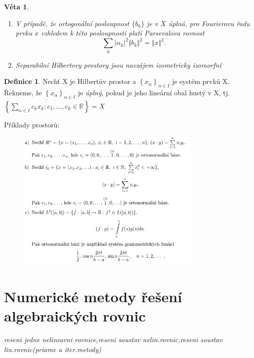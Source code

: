 \documentclass[a4]{report}
\newtheorem{theorem}{Věta}
\theoremstyle{definition}
\newtheorem{definition}{Definice}[section]
\begin{document}
{\begin{theorem}
\begin{enumerate}
		\item V případě, že ortogonální posloupnost $\{b_k\}$ je v $X$ úplná, pro Fourierovu řadu prvku $x$ vzhledem k této  posloupnosti platí \textit{Parsevalova rovnost} \begin{equation*}
			\sum_k|\alpha_k|^2\Vert b_k\Vert^2 = \Vert x \Vert ^2.
		\end{equation*}
		\item Separabilní Hilbertovy prostory jsou navzájem izometricky izomorfní
	\end{enumerate}
\end{theorem}

\begin{definition}
Nechť X je Hilbertův prostor a $ \left\lbrace x_{\alpha} \right\rbrace_{\alpha \in I} $ je systém prvků X. Řekneme, že $ \left\lbrace x_{\alpha} \right\rbrace_{\alpha \in I} $ je \textit{úplný}, pokud je jeho lineární obal hustý v X, tj. $ \overline{\left\lbrace \sum_{\alpha \in I} c_k x_k: c_1,\ldots,c_k \in \mathbb{R} \right\rbrace} =X $
\end{definition}






Příklady prostorů:
\begin{figure}[h!]
\includegraphics[width=0.8\textwidth]{priklady_prostoru}
\end{figure}


\section{Numerické metody řešení algebraických rovnic}  
\textit{reseni jedne nelinearni rovnice,reseni soustav nelin.rovnic,reseni soustav lin.rovnic(priame a iter.metody)}

}
\end{document}
